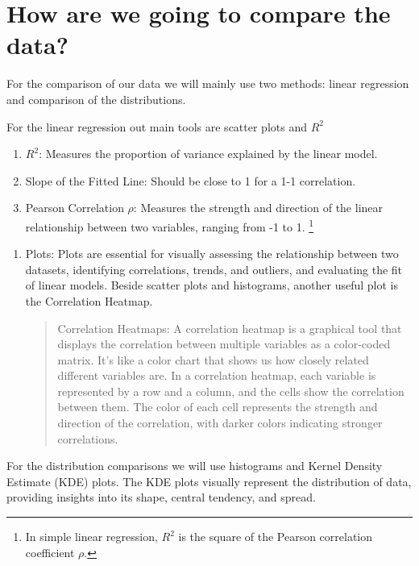 \documentclass[
]{article}
\begin{document}
\section{How are we going to compare the
data?}\label{how-are-we-going-to-compare-the-data}

For the comparison of our data we will mainly use two methods: linear
regression and comparison of the distributions.

For the linear regression out main tools are scatter plots and \(R^2\)

\begin{enumerate}
\def\labelenumi{\arabic{enumi}.}
\item
  \(R^2\): Measures the proportion of variance explained by the linear
  model.
\item
  Slope of the Fitted Line: Should be close to 1 for a 1-1 correlation.
\item
  Pearson Correlation \(\rho\): Measures the strength and direction of
  the linear relationship between two variables, ranging from -1 to 1.
  \footnote{In simple linear regression, \(R^2\) is the square of the
    Pearson correlation coefficient \(\rho\).}
\end{enumerate}

\begin{enumerate}
\def\labelenumi{\arabic{enumi}.}
\setcounter{enumi}{3}
\item
  Plots: Plots are essential for visually assessing the relationship
  between two datasets, identifying correlations, trends, and outliers,
  and evaluating the fit of linear models. Beside scatter plots and
  histograms, another useful plot is the Correlation Heatmap.

  \begin{quote}
  Correlation Heatmaps: A correlation heatmap is a graphical tool that
  displays the correlation between multiple variables as a color-coded
  matrix. It's like a color chart that shows us how closely related
  different variables are. In a correlation heatmap, each variable is
  represented by a row and a column, and the cells show the correlation
  between them. The color of each cell represents the strength and
  direction of the correlation, with darker colors indicating stronger
  correlations.
  \end{quote}
\end{enumerate}

For the distribution comparisons we will use histograms and Kernel
Density Estimate (KDE) plots. The KDE plots visually represent the
distribution of data, providing insights into its shape, central
tendency, and spread.
\end{document}
